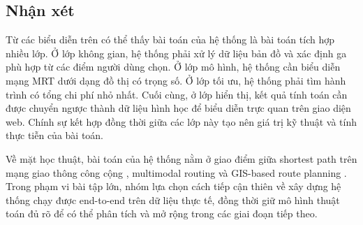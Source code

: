 \documentclass[../DoAn.tex]{subfiles}
\begin{document}
\subsection{Nhận xét}
Từ các biểu diễn trên có thể thấy bài toán của hệ thống là bài toán tích hợp nhiều lớp. Ở lớp không gian, hệ thống phải xử lý dữ liệu bản đồ và xác định ga phù hợp từ các điểm người dùng chọn. Ở lớp mô hình, hệ thống cần biểu diễn mạng MRT dưới dạng đồ thị có trọng số. Ở lớp tối ưu, hệ thống phải tìm hành trình có tổng chi phí nhỏ nhất. Cuối cùng, ở lớp hiển thị, kết quả tính toán cần được chuyển ngược thành dữ liệu hình học để biểu diễn trực quan trên giao diện web. Chính sự kết hợp đồng thời giữa các lớp này tạo nên giá trị kỹ thuật và tính thực tiễn của bài toán.

Về mặt học thuật, bài toán của hệ thống nằm ở giao điểm giữa shortest path trên mạng giao thông công cộng \cite{bast2016route}, multimodal routing và GIS-based route planning \cite{geospatial}. Trong phạm vi bài tập lớn, nhóm lựa chọn cách tiếp cận thiên về xây dựng hệ thống chạy được end-to-end trên dữ liệu thực tế, đồng thời giữ mô hình thuật toán đủ rõ để có thể phân tích và mở rộng trong các giai đoạn tiếp theo.
\end{document}
